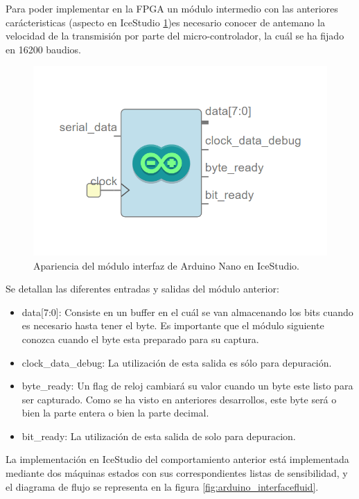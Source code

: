 Para poder implementar en la FPGA un módulo intermedio con las anteriores carácteristicas (aspecto en IceStudio \ref{fig:arduino_interface})es necesario conocer de antemano la velocidad de la transmisión por parte del micro-controlador, la cuál se ha fijado en 16200 baudios. \newline


\begin{figure}[H]
	\center
	\includegraphics[scale=0.6]{imagenes/Balancing_robot/arduino_interface.PNG}
	\caption{Apariencia del módulo interfaz de Arduino Nano en IceStudio.}
	\label{fig:arduino_interface}
\end{figure}

Se detallan las diferentes entradas y salidas del módulo anterior: 

\begin{itemize}
	\item data[7:0]: Consiste en un buffer en el cuál se van almacenando los bits cuando es necesario hasta tener el byte. Es importante que el módulo siguiente conozca cuando el byte esta preparado para su captura.
	\item clock\_data\_debug: La utilización de esta salida es sólo para depuración.
	\item byte\_ready: Un flag de reloj cambiará su valor cuando un byte este listo para ser capturado. Como se ha visto en anteriores desarrollos, este byte será o bien la parte entera o bien la parte decimal.
	\item bit\_ready: La utilización de esta salida de solo para depuracion.
\end{itemize} 

La implementación en IceStudio del comportamiento anterior está implementada mediante dos máquinas estados con sus correspondientes listas de sensibilidad, y el diagrama de flujo se representa en la figura \ref{fig:arduino_interfacefluid}.

